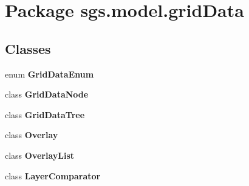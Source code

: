 \section{Package sgs.\-model.\-grid\-Data}
\label{namespacesgs_1_1model_1_1grid_data}
\subsection*{Classes}
\begin{DoxyCompactItemize}
\item 
enum {\bf Grid\-Data\-Enum}
\item 
class {\bf Grid\-Data\-Node}
\item 
class {\bf Grid\-Data\-Tree}
\item 
class {\bf Overlay}
\item 
class {\bf Overlay\-List}
\item 
class {\bfseries Layer\-Comparator}
\end{DoxyCompactItemize}
